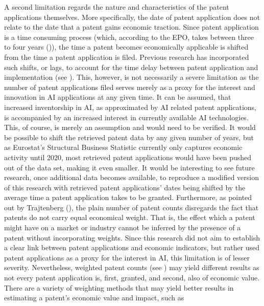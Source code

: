 \documentclass[
  12pt,
  a4paperpaper,
]{article}
\begin{document}
A second limitation regards the nature and characteristics of the patent
applications themselves. More specifically, the date of patent
application does not relate to the date that a patent gains economic
traction. Since patent application is a time consuming process (which,
according to the EPO, takes between three to four years
()), the time a patent becomes economically applicable is
shifted from the time a patent application is filed. Previous research
has incorporated such shifts, or lags, to account for the time delay
between patent application and implementation (see
).
This, however, is not necessarily a severe limitation as the number of
patent applications filed serves merely as a proxy for the interest and
innovation in AI applications at any given time. It can be assumed, that
increased inventorship in AI, as approximated by AI related patent
applications, is accompanied by an increased interest in currently
available AI technologies. This, of course, is merely an assumption and
would need to be verified. It would be possible to shift the retrieved
patent data by any given number of years, but as Eurostat's Structural
Business Statistic currently only captures economic activity until 2020,
most retrieved patent applications would have been pushed out of the
data set, making it even smaller. It would be interesting to see future
research, once additional data becomes available, to reproduce a
modified version of this research with retrieved patent applications'
dates being shifted by the average time a patent application takes to be
granted. Furthermore, as pointed out by Trajtenberg
(), the plain number of
patent counts disregards the fact that patents do not carry equal
economical weight. That is, the effect which a patent might have on a
market or industry cannot be inferred by the presence of a patent
without incorporating weights. Since this research did not aim to
establish a clear link between patent applications and economic
indicators, but rather used patent applications as a proxy for the
interest in AI, this limitation is of lesser severity. Nevertheless,
weighted patent counts (see ) may yield different results as not every patent
application is, first, granted, and second, also of economic value.
There are a variety of weighting methods that may yield better results
in estimating a patent's economic value and impact, such as
\end{document}
